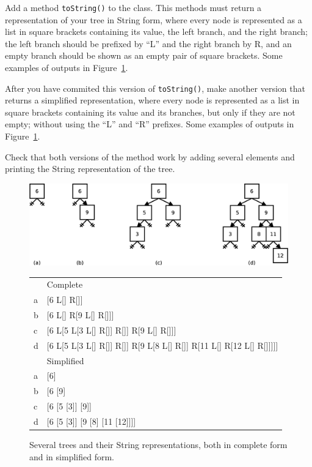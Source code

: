 \documentclass{article}
\begin{document}
Add a method \verb+toString()+ to the class. This methods must return
a representation of your tree in String form, where every node is
represented as a list in square brackets containing its value, the
left branch, and the right branch; the left branch should be prefixed
by ``L'' and the right branch by R, and an empty branch should be
shown as an empty pair of square brackets. 
Some examples of outputs in Figure~\ref{fig:jdjfj}.

After you have commited this version of \verb+toString()+, make
another version that returns a simplified representation, where every
node is represented as a list in square brackets containing its value
and its branches, but only if they are not empty; without using the
``L'' and ``R'' prefixes. 
Some examples of outputs in Figure~\ref{fig:jdjfj}.

Check that both versions of the method work by adding several elements
and printing the String representation of the tree. 

\begin{figure}[hbtp]
  \centering
  \includegraphics[width=\textwidth]{gfx/tree-toString}
  \begin{tabular}{ll}
      & Complete \\
    a & [6 L[] R[]] \\
    b & [6 L[] R[9 L[] R[]]] \\
    c & [6 L[5 L[3 L[] R[]] R[]] R[9 L[] R[]]] \\
    d & [6 L[5 L[3 L[] R[]] R[]] R[9 L[8 L[] R[]] R[11 L[] R[12 L[] R[]]]]] \\
      & Simplified \\
    a & [6] \\
    b & [6 [9] \\
    c & [6 [5 [3]] [9]] \\
    d & [6 [5 [3]] [9 [8] [11 [12]]]] \\
  \end{tabular}
  \caption{Several trees and their String representations, both in
    complete form and in simplified form.}
  \label{fig:jdjfj}
\end{figure}
\end{document}
